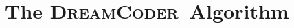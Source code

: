 \documentclass{article}
\newcommand{\system}{\textsc{DreamCoder}~}
\newcommand{\probability}{\mathds{P}} %
\begin{document}




\section{The \system Algorithm}
\end{document}
